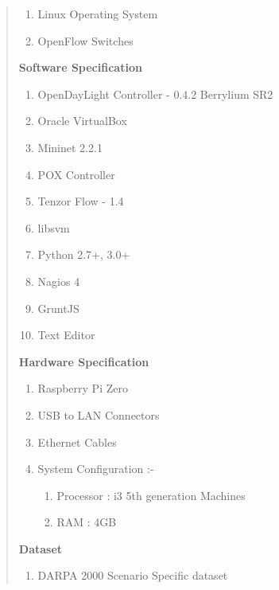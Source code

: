 \documentclass[12pt,a4paper,final]{article}
\begin{document}
\begin{flushleft}
\begin{quotation}
\begin{enumerate}
\item
Linux Operating System

\item
OpenFlow Switches
\end{enumerate}

\textbf{Software Specification}
\begin{enumerate}
\item
OpenDayLight Controller - 0.4.2 Berrylium SR2

\item
Oracle VirtualBox

\item
Mininet 2.2.1

\item
POX Controller

\item
Tenzor Flow - 1.4

\item
libsvm

\item
Python 2.7+, 3.0+

\item
Nagios 4

\item
GruntJS

\item
Text Editor
\end{enumerate}

\textbf{Hardware Specification}
\begin{enumerate}
\item
Raspberry Pi Zero

\item
USB to LAN Connectors

\item
Ethernet Cables

\item
System Configuration :- 
\begin{enumerate}
\item
Processor : i3 5th generation Machines

\item
RAM : 4GB
\end{enumerate}
\end{enumerate}

\textbf{Dataset}
\begin{enumerate}
\item
DARPA 2000 Scenario Specific dataset
\end{enumerate}
\end{quotation}


\end{flushleft}
\end{document}
